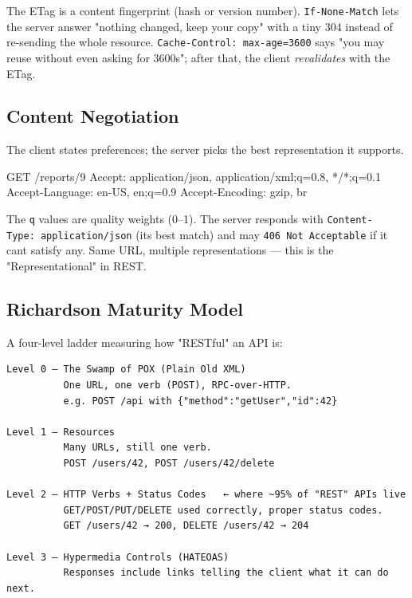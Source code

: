 \documentclass[11pt]{article}
\newenvironment{Shaded}{\begin{snugshade}}{\end{snugshade}}
\newcommand{\NormalTok}[1]{\textcolor[rgb]{0.81,0.81,0.76}{#1}}
\begin{document}
The ETag is a content fingerprint (hash or version number). \texttt{If-None-Match} lets the server answer "nothing changed, keep your copy" with a tiny 304 instead of re-sending the whole resource. \texttt{Cache-Control:\ max-age=3600} says "you may reuse without even asking for 3600s"; after that, the client \emph{revalidates} with the ETag.

\subsection{Content Negotiation}\label{content-negotiation}

The client states preferences; the server picks the best representation it supports.


\begin{Shaded}
\begin{Highlighting}[]
\NormalTok{GET /reports/9}
\NormalTok{Accept: application/json, application/xml;q=0.8, */*;q=0.1}
\NormalTok{Accept{-}Language: en{-}US, en;q=0.9}
\NormalTok{Accept{-}Encoding: gzip, br}
\end{Highlighting}
\end{Shaded}

The \texttt{q} values are quality weights (0--1). The server responds with \texttt{Content-Type:\ application/json} (its best match) and may \texttt{406\ Not\ Acceptable} if it can\textquotesingle t satisfy any. Same URL, multiple representations --- this is the "Representational" in REST.

\subsection{Richardson Maturity Model}\label{richardson-maturity-model}

A four-level ladder measuring how "RESTful" an API is:

\setcodelang{}

\begin{verbatim}
Level 0 — The Swamp of POX (Plain Old XML)
          One URL, one verb (POST), RPC-over-HTTP.
          e.g. POST /api with {"method":"getUser","id":42}

Level 1 — Resources
          Many URLs, still one verb.
          POST /users/42, POST /users/42/delete

Level 2 — HTTP Verbs + Status Codes   ← where ~95% of "REST" APIs live
          GET/POST/PUT/DELETE used correctly, proper status codes.
          GET /users/42 → 200, DELETE /users/42 → 204

Level 3 — Hypermedia Controls (HATEOAS)
          Responses include links telling the client what it can do next.
\end{verbatim}
\end{document}
